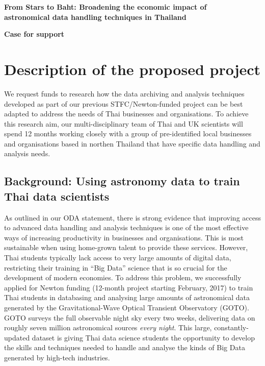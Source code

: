 \documentclass[11pt]{article}
\begin{document}
\setcounter{figure}{0}
\noindent
{\LARGE \bf From Stars to Baht: Broadening the economic impact of \\
astronomical data handling techniques in Thailand}

\vspace{3mm}
\noindent
{\LARGE \bf Case for support}
\vspace{-3mm}
\section{Description of the proposed project}
\noindent
We request funds to research how the data archiving and analysis techniques developed as part of our previous STFC/Newton-funded project can be best adapted to address the needs of Thai businesses and organisations. To achieve this research aim, our multi-disciplinary team of Thai and UK scientists will spend 12 months working closely with a group of pre-identified local businesses and organisations based in northen Thailand that have specific data handling and analysis needs.

\subsection{Background: Using astronomy data to train Thai data scientists}
As outlined in our ODA statement, there is strong evidence that improving access to advanced data handling and analysis techniques is one of the most effective ways of increasing productivity in businesses and organisations. This is most sustainable when using home-grown talent to provide these services. However, Thai students typically lack access to very large amounts of digital data, restricting their training in ``Big Data'' science that is so crucial for the development of modern economies. To address this problem, we successfully applied for Newton funding (12-month project starting February, 2017) to train Thai students in databasing and analysing large amounts of astronomical data generated by the Gravitational-Wave Optical Transient Observatory (GOTO). GOTO surveys the full observable night sky every two weeks, delivering data on roughly seven million astronomical sources {\it every night}. This large, constantly-updated dataset is giving Thai data science students the opportunity to develop the skills and techniques needed to handle and analyse the kinds of Big Data generated by high-tech industries.
\end{document}
